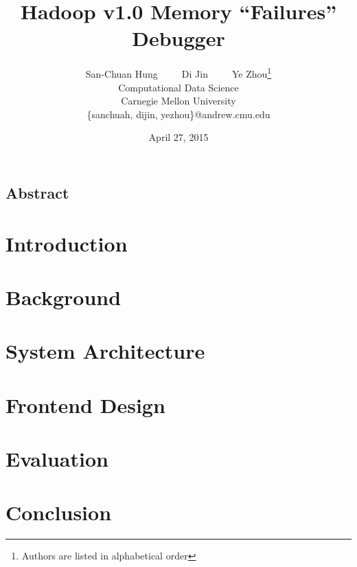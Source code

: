 \documentclass[letterpaper,twocolumn,10pt]{article}
\begin{document}
\date{April 27, 2015}

\title{\Large \bf Hadoop v1.0 Memory “Failures” Debugger}

\author{
{\rm San-Chuan Hung}~~~~~{\rm Di Jin}~~~~~{\rm Ye Zhou}\thanks{Authors are listed in alphabetical order}\\
Computational Data Science\\
Carnegie Mellon University\\
\{sanchuah, dijin, yezhou\}@andrew.cmu.edu\\
} %

\maketitle

\thispagestyle{empty}


\subsection*{Abstract}
\label{sec:dl}



\section{Introduction}


\section{Background}


\section{System Architecture}


\section{Frontend Design}


\section{Evaluation}


\section{Conclusion}




\end{document}
